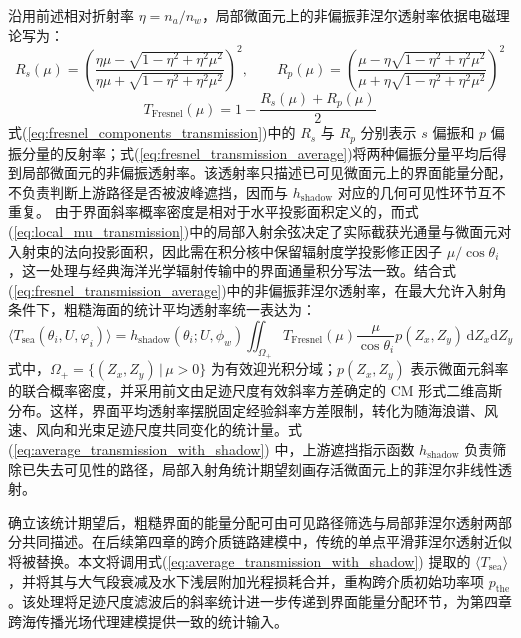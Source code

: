 沿用前述相对折射率 $\eta=n_a/n_w$，局部微面元上的非偏振菲涅尔透射率依据电磁理论写为：
\begin{equation}
	R_s(\mu) = \left( \frac{\eta\mu-\sqrt{1-\eta^2+\eta^2\mu^2}}{\eta\mu+\sqrt{1-\eta^2+\eta^2\mu^2}} \right)^2, \qquad R_p(\mu) = \left( \frac{\mu-\eta\sqrt{1-\eta^2+\eta^2\mu^2}}{\mu+\eta\sqrt{1-\eta^2+\eta^2\mu^2}} \right)^2
	\label{eq:fresnel_components_transmission}
\end{equation}
\begin{equation}
	T_{\mathrm{Fresnel}}(\mu) = 1 - \frac{R_s(\mu)+R_p(\mu)}{2}
	\label{eq:fresnel_transmission_average}
\end{equation}
式(\ref{eq:fresnel_components_transmission})中的 $R_s$ 与 $R_p$ 分别表示 $s$ 偏振和 $p$ 偏振分量的反射率；式(\ref{eq:fresnel_transmission_average})将两种偏振分量平均后得到局部微面元的非偏振透射率。该透射率只描述已可见微面元上的界面能量分配，不负责判断上游路径是否被波峰遮挡，因而与 $h_{\mathrm{shadow}}$ 对应的几何可见性环节互不重复。
由于界面斜率概率密度是相对于水平投影面积定义的，而式(\ref{eq:local_mu_transmission})中的局部入射余弦决定了实际截获光通量与微面元对入射束的法向投影面积，因此需在积分核中保留辐射度学投影修正因子 $\mu/\cos\theta_i$，这一处理与经典海洋光学辐射传输中的界面通量积分写法一致。结合式(\ref{eq:fresnel_transmission_average})中的非偏振菲涅尔透射率，在最大允许入射角条件下，粗糙海面的统计平均透射率统一表达为：
\begin{equation}
	\langle T_{\mathrm{sea}}(\theta_i, U, \varphi_i) \rangle = h_{\mathrm{shadow}}(\theta_i; U, \phi_w) \iint_{\Omega_+} T_{\mathrm{Fresnel}}(\mu) \frac{\mu}{\cos\theta_i} p(Z_x,Z_y) \,\mathrm{d}Z_x\mathrm{d}Z_y
	\label{eq:average_transmission_with_shadow}
\end{equation}
式中，$\Omega_+=\{(Z_x,Z_y)\,|\,\mu>0\}$ 为有效迎光积分域；$p(Z_x,Z_y)$ 表示微面元斜率的联合概率密度，并采用前文由足迹尺度有效斜率方差确定的 CM 形式二维高斯分布。这样，界面平均透射率摆脱固定经验斜率方差限制，转化为随海浪谱、风速、风向和光束足迹尺度共同变化的统计量。式(\ref{eq:average_transmission_with_shadow}) 中，上游遮挡指示函数 $h_{\mathrm{shadow}}$ 负责筛除已失去可见性的路径，局部入射角统计期望刻画存活微面元上的菲涅尔非线性透射。

确立该统计期望后，粗糙界面的能量分配可由可见路径筛选与局部菲涅尔透射两部分共同描述。在后续第四章的跨介质链路建模中，传统的单点平滑菲涅尔透射近似将被替换。本文将调用式(\ref{eq:average_transmission_with_shadow}) 提取的 $\langle T_{\mathrm{sea}} \rangle$，并将其与大气段衰减及水下浅层附加光程损耗合并，重构跨介质初始功率项 $p_{\mathrm{the}}$。该处理将足迹尺度滤波后的斜率统计进一步传递到界面能量分配环节，为第四章跨海传播光场代理建模提供一致的统计输入。

